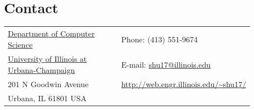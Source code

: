 \section{\sc Contact}
\vspace{.05in}
\begin{tabular}{@{}p{3.6in}p{4in}}
{\href{http://www.cs.illinois.edu/}{Department of Computer Science}}           & {Phone:}  (413) 551-9674 \\
{\href{http://www.illinois.edu/}{University of Illinois at Urbana-Champaign}}  & {E-mail:} {\href{mailto:shu17@illinois.edu}{shu17@illinois.edu}}\\
201 N Goodwin Avenue                                                           & {\url{http://web.engr.illinois.edu/~shu17/}}\\
Urbana, IL 61801 USA\\
\end{tabular}



